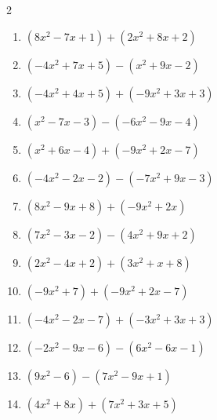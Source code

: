 \begin{multicols}{2}
\begin{enumerate}
  \item $(8x^{2}-7x+1)+(2x^{2}+8x+2)$


  \item $(-4x^{2}+7x+5)-(x^{2}+9x-2)$


  \item $(-4x^{2}+4x+5)+(-9x^{2}+3x+3)$


  \item $(x^{2}-7x-3)-(-6x^{2}-9x-4)$


  \item $(x^{2}+6x-4)+(-9x^{2}+2x-7)$


  \item $(-4x^{2}-2x-2)-(-7x^{2}+9x-3)$


  \item $(8x^{2}-9x+8)+(-9x^{2}+2x)$


  \item $(7x^{2}-3x-2)-(4x^{2}+9x+2)$


  \item $(2x^{2}-4x+2)+(3x^{2}+x+8)$


  \item $(-9x^{2}+7)+(-9x^{2}+2x-7)$


  \item $(-4x^{2}-2x-7)+(-3x^{2}+3x+3)$


  \item $(-2x^{2}-9x-6)-(6x^{2}-6x-1)$


\columnbreak %

  \item $(9x^{2}-6)-(7x^{2}-9x+1)$


  \item $(4x^{2}+8x)+(7x^{2}+3x+5)$


\end{enumerate}
\end{multicols}
